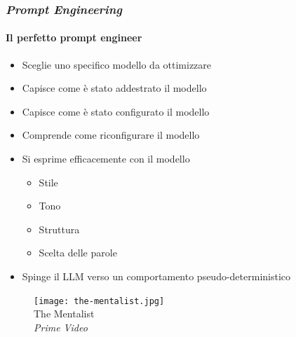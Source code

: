 \begin{frame}[t] \frametitle{\emph{Prompt Engineering}}
\framesubtitle{Il perfetto prompt engineer}
	{\footnotesize
	    \begin{minipage}[t]{\textwidth}
			\begin{minipage}[t]{0.6\textwidth}
	    		\begin{itemize}[leftmargin=10pt,align=right]
					\onslide<1->\item[\alert{\faArrowCircleRight}] Sceglie uno \alert{specifico} modello da ottimizzare
					\onslide<2->\item[\alert{\faArrowCircleRight}] Capisce come è stato addestrato il modello
					\onslide<3->\item[\alert{\faArrowCircleRight}] Capisce come è stato configurato il modello
                    \item[\alert{\faArrowCircleRight}] Comprende come riconfigurare il modello
					\onslide<5->\item[\alert{\faArrowCircleRight}] Si esprime efficacemente con il modello
                    \begin{itemize}[leftmargin=10pt,align=right]
                        \item[\alert{\faArrowCircleRight}] Stile
                        \item[\alert{\faArrowCircleRight}] Tono
                        \item[\alert{\faArrowCircleRight}] Struttura
                        \item[\alert{\faArrowCircleRight}] Scelta delle parole
                    \end{itemize}
                    \item[\alert{\faExclamationTriangle}] Spinge il LLM verso un comportamento \alert{pseudo-deterministico}  
				\end{itemize}
            \end{minipage}
			\hfill
            \begin{minipage}[t]{0.4\textwidth}
                \centering
                \begin{figure}[ht]
                    \texttt{[image: the-mentalist.jpg]}
                    {\tiny\\The Mentalist\\\vspace*{-1pt}\textit{\textcopyright Prime Video}}
                \end{figure}
            \end{minipage}
	    \end{minipage}
	}
\end{frame}
